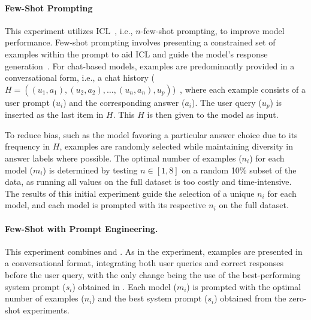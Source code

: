 \paragraph{Few-Shot Prompting}
\label{sec:few-shot-prompt}

This experiment utilizes \ac{ICL}~\cite{brownLanguageModelsAre2020}, i.e., $n$-few-shot prompting, to improve model performance. Few-shot prompting involves presenting a constrained set of examples within the prompt to aid \acl{ICL} and guide the model's response generation~\cite{brownLanguageModelsAre2020}. For chat-based models, examples are predominantly provided in a conversational form, i.e., a chat history ($H = ((u_1, a_1), (u_2, a_2), \ldots, (u_n, a_n), u_p)$)~\cite{HowUseFew}, where each example consists of a user prompt ($u_i$) and the corresponding answer ($a_i$). The user query ($u_p$) is inserted as the last item in $H$. This $H$ is then given to the model as input.

To reduce bias, such as the model favoring a particular answer choice due to its frequency in $H$, examples are randomly selected while maintaining diversity in answer labels where possible. The optimal number of examples ($n_i$) for each model ($m_i$) is determined by testing $n \in [1, 8]$ on a random 10\% subset of the data, as running all values on the full dataset is too costly and time-intensive. The results of this initial experiment guide the selection of a unique $n_i$ for each model, and each model is prompted with its respective $n_i$ on the full dataset.

\paragraph{Few-Shot with Prompt Engineering.}
\label{sec:few-shot-optimized}

This experiment combines  and . As in the  experiment, examples are presented in a conversational format, integrating both user queries and correct responses before the user query, with the only change being the use of the best-performing system prompt ($s_i$) obtained in . Each model ($m_i$) is prompted with the optimal number of examples ($n_i$) and the best system prompt ($s_i$) obtained from the zero-shot experiments.


